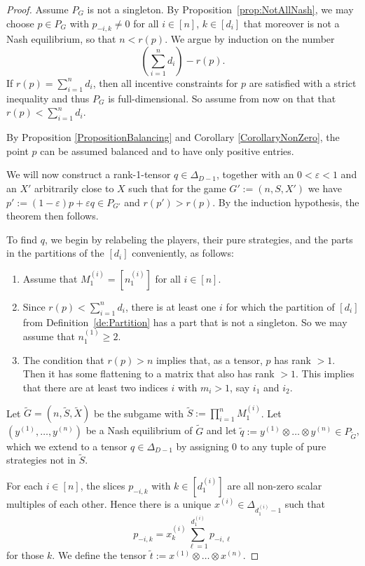 \documentclass[10pt,a4paper]{amsart}
\renewcommand{\tilde}[1]{\widetilde{#1}}
\begin{document}
\begin{proof}
Assume $P_G$ is not a singleton. By Proposition~\ref{prop:NotAllNash}, we may choose $p \in P_G$ with $p_{-i,k} \neq 0$ for all $i \in [n]$, $k \in [d_i]$ that moreover is not a Nash equilibrium, so that $n<r(p)$. 
We argue by induction on the number \[
\left(\sum_{i=1}^n d_i\right)-r(p).\] 
If $r(p)=\sum_{i=1}^n d_i$, then all
incentive constraints for $p$ are satisfied with a strict inequality
and thus $P_G$ is full-dimensional. So assume from now on that that $r(p)<\sum_{i=1}^n d_i$. 

By Proposition \ref{PropositionBalancing} and Corollary
\ref{CorollaryNonZero}, the point $p$ can be assumed balanced and to
have only positive entries. 

We will now construct
a rank-1-tensor $q \in \Delta_{D-1}$, together with an $0<\varepsilon<1$
and an $X'$ arbitrarily close to $X$ such that for the game
$G':=(n,S,X')$ we have $p':=(1-\varepsilon)p
+ \varepsilon q \in P_{G'}$ and $r(p')>r(p).$ By
the induction hypothesis, the theorem then follows.

To find $q$, we begin by relabeling the players, their pure strategies, and the
parts in the partitions of the $[d_i]$ conveniently, as follows:
\begin{enumerate}
    \item Assume that $M^{(i)}_1=[n_1^{(i)}]$ for all $i \in [n]$. 
    \item Since $r(p)< \sum_{i=1}^n d_i$, there is at least one $i$
    for which the partition of $[d_i]$ from
    Definition~\ref{de:Partition} has a part that is not a
    singleton. So we may assume that $n_1^{(1)} \geq 2$.
    \item The condition that $r(p)>n$ implies that, as a tensor, $p$
    has rank $>1$. Then it has some flattening to a matrix that also
    has rank $>1$. This implies that there are at least two indices
    $i$ with $m_{i}>1$, say $i_1$ and $i_2$. 
\end{enumerate}

Let $\tilde{G}=(n,\tilde{S},\tilde{X})$ be the subgame with
$\tilde{S}:=\prod_{i=1}^n M^{(i)}_1$. Let $(y^{(1)},\dots, y^{(n)})$
be a Nash equilibrium of $\tilde{G}$ and let $\tilde{q}:=y^{(1)}
\otimes \dots \otimes y^{(n)} \in P_{\tilde{G}}$, which we extend to a
tensor $q \in \Delta_{D-1}$ by assigning $0$ to any tuple of pure
strategies not in $\tilde{S}$. 

For each $i \in [n]$, the slices $p_{-i,k}$ with $k \in [d^{(i)}_1]$
are all non-zero scalar multiples of each other. Hence 
there is a unique $x^{(i)} \in \Delta_{d^{(i)}_1 -1}$ such that
\[p_{-i,k}= x^{(i)}_k  \sum_{\ell =1}^{d^{(i)}_1} p_{-i,\ell}\]
for those $k$. We define the tensor $\tilde{t} := x^{(1)} \otimes \dots \otimes x^{(n)}$.


\end{proof}
\end{document}
